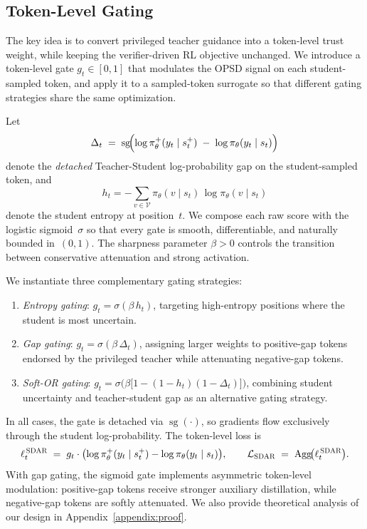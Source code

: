 \documentclass{article} %
\newcommand{\methodname}{\textsc{SDAR}\xspace}
\begin{document}
\subsection{Token-Level Gating}
\label{sec:token_gating}

The key idea is to convert privileged teacher guidance into a token-level trust weight, 
while keeping the verifier-driven RL objective unchanged. 
We introduce a token-level gate $g_t\in[0,1]$ that modulates the OPSD signal on each student-sampled token,
and apply it to a sampled-token surrogate so that different gating strategies share the same optimization.

Let
\[
\Delta_t
\;=\;
\operatorname{sg}\!\Bigl(
  \log\pi_{\theta}^{+}(y_t\mid s_t^{+})
  \;-\;
  \log\pi_{\theta}(y_t\mid s_t)
\Bigr)
\]
denote the \emph{detached} Teacher-Student log-probability gap on the student-sampled token, and
\[
h_t = -\sum_{v\in\mathcal{V}} \pi_{\theta}(v\mid s_t)\,\log\pi_{\theta}(v\mid s_t)
\]
denote the student entropy at position~$t$.
We compose each raw score with the logistic sigmoid~$\sigma$
so that every gate is smooth, differentiable, and naturally bounded in~$(0,1)$.
The sharpness parameter $\beta>0$ controls the transition between conservative attenuation and strong activation.

We instantiate three complementary gating strategies:
\begin{enumerate}
  \item \emph{Entropy gating}: $g_t = \sigma(\beta\,h_t)$,
    targeting high-entropy positions where the student is most uncertain.
  \item \emph{Gap gating}: $g_t = \sigma(\beta\,\Delta_t)$,
    assigning larger weights to positive-gap tokens endorsed by the privileged teacher while attenuating negative-gap tokens.
  \item \emph{Soft-OR gating}: $g_t = \sigma\!\bigl(\beta\bigl[1 - (1-h_t)(1-\Delta_t)\bigr]\bigr)$,
    combining student uncertainty and teacher-student gap as an alternative gating strategy.
\end{enumerate}

In all cases, the gate is detached via $\operatorname{sg}(\cdot)$,
so gradients flow exclusively through the student log-probability.
The token-level loss is
\[
\ell_t^{\,\methodname}
\;=\;
g_t \cdot
\bigl(
  \log\pi_{\theta}^{+}(y_t\mid s_t^{+})
  -
  \log\pi_{\theta}(y_t\mid s_t)
\bigr),
\qquad
\mathcal{L}_{\methodname}
\;=\;
\operatorname{Agg}\!\bigl(\ell_t^{\,\methodname}\bigr).
\]
With gap gating, the sigmoid gate implements asymmetric token-level modulation: positive-gap tokens receive stronger auxiliary distillation, while negative-gap tokens are softly attenuated.
We also provide theoretical analysis of our design in Appendix~\ref{appendix:proof}.
\end{document}
